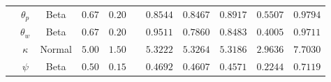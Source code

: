 \begin{table}
\begin{tabular}{|cc|ccc|c|ccccc|}
 & $\theta_p$ & Beta & $0.67$ & $0.20$ & & $ 0.8544$ & $ 0.8467$ & $ 0.8917$& $ 0.5507$ & $ 0.9794$ \\ 
 & $\theta_w$ & Beta & $0.67$ & $0.20$ & & $ 0.9511$ & $ 0.7860$ & $ 0.8483$& $ 0.4005$ & $ 0.9711$ \\ 
 & $\kappa$ & Normal & $5.00$ & $1.50$ & & $ 5.3222$ & $ 5.3264$ & $ 5.3186$& $ 2.9636$ & $ 7.7030$ \\ 
 & $\psi$ & Beta & $0.50$ & $0.15$ & & $ 0.4692$ & $ 0.4607$ & $ 0.4571$& $ 0.2244$ & $ 0.7119$ \\ \hline 
 \end{tabular} 
\end{table} 
